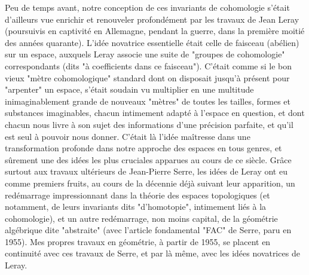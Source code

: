 Peu de temps avant, notre conception de ces invariants de cohomologie s'était d'ailleurs vue enrichir et renouveler profondément par les travaux de Jean Leray (poursuivis en captivité en Allemagne, pendant la guerre, dans la première moitié des années quarante). L'idée novatrice essentielle était celle de faisceau (abélien) sur un espace, auxquels Leray associe une suite de "groupes de cohomologie" correspondants (dits "à coefficients dans ce faisceau"). C'était comme si le bon vieux "mètre cohomologique" standard dont on disposait jusqu'à présent pour "arpenter" un espace, s'était soudain vu multiplier en une multitude inimaginablement grande de nouveaux "mètres" de toutes les tailles, formes et substances imaginables, chacun intimement adapté à l'espace en question, et dont chacun nous livre à son sujet des informations d'une précision parfaite, et qu'il est seul à pouvoir nous donner. C'était là l'idée maîtresse dans une transformation profonde dans notre approche des espaces en tous genres, et sûrement une des idées les plus cruciales apparues au cours de ce siècle. Grâce surtout aux travaux ultérieurs de Jean-Pierre Serre, les idées de Leray ont eu comme premiers fruits, au cours de la décennie déjà suivant leur apparition, un redémarrage impressionnant dans la théorie des espaces topologiques (et notamment, de leurs invariants dits "d'homotopie", intimement liés à la cohomologie), et un autre redémarrage, non moins capital, de la géométrie algébrique dite "abstraite" (avec l'article fondamental "FAC" de Serre, paru en 1955). Mes propres travaux en géométrie, à partir de 1955, se placent en continuité avec ces travaux de Serre, et par là même, avec les idées novatrices de Leray.




